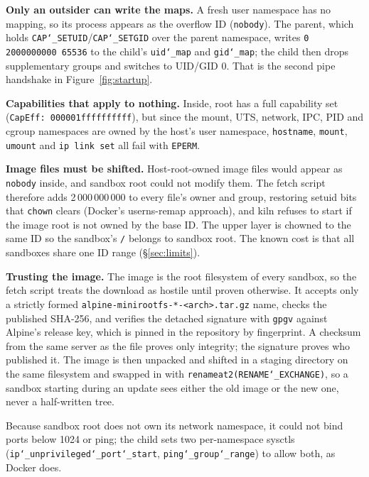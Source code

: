 \documentclass[10pt,letterpaper]{article}
\newcommand{\code}[1]{\texttt{#1}}
\newcommand{\us}{\char`\_}
\begin{document}
\textbf{Only an outsider can write the maps.} A fresh user namespace has no
mapping, so its process appears as the overflow ID (\code{nobody}). The parent,
which holds \code{CAP\us{}SETUID}/\code{CAP\us{}SETGID} over the parent namespace,
writes \code{0 2000000000 65536} to the child's \code{uid\us{}map} and
\code{gid\us{}map}; the child then drops supplementary groups and switches to
UID/GID 0. That is the second pipe handshake in Figure~\ref{fig:startup}.

\textbf{Capabilities that apply to nothing.} Inside, root has a full capability
set (\code{CapEff: 000001ffffffffff}), but since the mount, UTS, network, IPC,
PID and cgroup namespaces are owned by the host's user namespace,
\code{hostname}, \code{mount}, \code{umount} and \code{ip link set} all fail with
\code{EPERM}.

\textbf{Image files must be shifted.} Host-root-owned image files would appear as
\code{nobody} inside, and sandbox root could not modify them. The fetch script
therefore adds 2\,000\,000\,000 to every file's owner and group, restoring setuid
bits that \code{chown} clears (Docker's userns-remap approach), and kiln refuses
to start if the image root is not owned by the base ID. The upper layer is
chowned to the same ID so the sandbox's \code{/} belongs to sandbox root. The
known cost is that all sandboxes share one ID range (\S\ref{sec:limits}).

\textbf{Trusting the image.} The image is the root filesystem of every sandbox,
so the fetch script treats the download as hostile until proven otherwise. It
accepts only a strictly formed \code{alpine-minirootfs-*-<arch>.tar.gz} name,
checks the published SHA-256, and verifies the detached signature with
\code{gpgv} against Alpine's release key, which is pinned in the repository by
fingerprint. A checksum from the same server as the file proves only integrity;
the signature proves who published it. The image is then unpacked and shifted in
a staging directory on the same filesystem and swapped in with
\code{renameat2(RENAME\us{}EXCHANGE)}, so a sandbox starting during an update
sees either the old image or the new one, never a half-written tree.

Because sandbox root does not own its network namespace, it could not bind
ports below 1024 or ping; the child sets two per-namespace sysctls
(\code{ip\us{}unprivileged\us{}port\us{}start}, \code{ping\us{}group\us{}range}) to
allow both, as Docker does.

\end{document}
